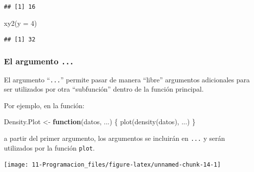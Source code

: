 \documentclass[
]{book}
\newenvironment{Shaded}{\begin{snugshade}}{\end{snugshade}}
\newcommand{\AttributeTok}[1]{\textcolor[rgb]{0.77,0.63,0.00}{#1}}
\newcommand{\ControlFlowTok}[1]{\textcolor[rgb]{0.13,0.29,0.53}{\textbf{#1}}}
\newcommand{\DecValTok}[1]{\textcolor[rgb]{0.00,0.00,0.81}{#1}}
\newcommand{\FunctionTok}[1]{\textcolor[rgb]{0.00,0.00,0.00}{#1}}
\newcommand{\NormalTok}[1]{#1}
\newcommand{\OtherTok}[1]{\textcolor[rgb]{0.56,0.35,0.01}{#1}}
\newcommand{\SpecialCharTok}[1]{\textcolor[rgb]{0.00,0.00,0.00}{#1}}
\newcommand{\StringTok}[1]{\textcolor[rgb]{0.31,0.60,0.02}{#1}}
\theoremstyle{break}
\theoremstyle{nonumberplain}
\begin{document}
\begin{verbatim}
## [1] 16
\end{verbatim}

\begin{Shaded}
\begin{Highlighting}[]
\FunctionTok{xy2}\NormalTok{(}\AttributeTok{y =} \DecValTok{4}\NormalTok{)}
\end{Highlighting}
\end{Shaded}

\begin{verbatim}
## [1] 32
\end{verbatim}

\hypertarget{el-argumento-...}{%
\subsubsection{\texorpdfstring{El argumento \texttt{...}}{El argumento ...}}\label{el-argumento-...}}

El argumento ``\texttt{...}'' permite
pasar de manera ``libre'' argumentos adicionales para ser utilizados por otra ``subfunción''
dentro de la función principal.

Por ejemplo, en la función:

\begin{Shaded}
\begin{Highlighting}[]
\NormalTok{Density.Plot }\OtherTok{\textless{}{-}} \ControlFlowTok{function}\NormalTok{(datos, ...) \{ }\FunctionTok{plot}\NormalTok{(}\FunctionTok{density}\NormalTok{(datos), ...) \}}
\end{Highlighting}
\end{Shaded}

a partir del primer argumento, los argumentos se incluirán en \texttt{...}
y serán utilizados por la función \texttt{plot}.

\begin{Shaded}
\end{Shaded}

\begin{center}\texttt{[image: 11-Programacion\_files/figure-latex/unnamed-chunk-14-1]} \end{center}

\begin{Shaded}
\end{Shaded}
\end{document}
